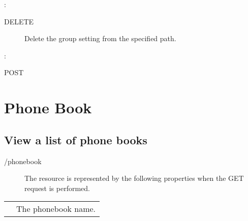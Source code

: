 \documentclass[letterpaper,10pt,english]{sphinxmanual}
\begin{document}
:

\begin{sphinxVerbatim}[commandchars=\\\{\}]
\end{sphinxVerbatim}
\begin{description}
\item[{ DELETE}] \leavevmode
Delete the group setting from the specified path.

\end{description}

:

\begin{sphinxVerbatim}[commandchars=\\\{\}]
\end{sphinxVerbatim}

 POST


\section{Phone Book}
\label{\detokenize{restapi:phone-book}}

\subsection{View a list of phone books}
\label{\detokenize{restapi:view-a-list-of-phone-books}}
 /phonebook
\begin{description}
\item[{}] \leavevmode
The resource is represented by the following properties when the GET request is performed.

\end{description}


\begin{savenotes}\sphinxattablestart
\centering
\begin{tabulary}{\linewidth}[t]{|T|T|}
\hline

&
\\
\hline
{}
&
The phonebook name.
\\
\hline
\end{tabulary}
\par
\sphinxattableend\end{savenotes}
\end{document}
